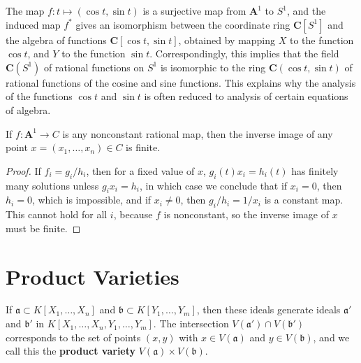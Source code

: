 \begin{example}
    The map $f: t \mapsto (\cos t, \sin t)$ is a surjective map from $\mathbf{A}^1$ to $S^1$, and the induced map $f^*$ gives an isomorphism between the coordinate ring $\mathbf{C}[S^1]$ and the algebra of functions $\mathbf{C}[\cos t, \sin t]$, obtained by mapping $X$ to the function $\cos t$, and $Y$ to the function $\sin t$. Correspondingly, this implies that the field $\mathbf{C}(S^1)$ of rational functions on $S^1$ is isomorphic to the ring $\mathbf{C}(\cos t, \sin t)$ of rational functions of the cosine and sine functions. This explains why the analysis of the functions $\cos t$ and $\sin t$ is often reduced to analysis of certain equations of algebra.
\end{example}

\begin{theorem}
    If $f: \mathbf{A}^1 \to C$ is any nonconstant rational map, then the inverse image of any point $x = (x_1, \dots, x_n) \in C$ is finite.
\end{theorem}
\begin{proof}
    If $f_i = g_i/h_i$, then for a fixed value of $x$, $g_i(t)x_i = h_i(t)$ has finitely many solutions unless $g_ix_i = h_i$, in which case we conclude that if $x_i = 0$, then $h_i = 0$, which is impossible, and if $x_i \neq 0$, then $g_i/h_i = 1/x_i$ is a constant map. This cannot hold for all $i$, because $f$ is nonconstant, so the inverse image of $x$ must be finite.
\end{proof}

\section{Product Varieties}

If $\mathfrak{a} \subset K[X_1, \dots, X_n]$ and $\mathfrak{b} \subset K[Y_1, \dots, Y_m]$, then these ideals generate ideals $\mathfrak{a}'$ and $\mathfrak{b}'$ in $K[X_1, \dots, X_n, Y_1, \dots, Y_m]$. The intersection $V(\mathfrak{a}') \cap V(\mathfrak{b}')$ corresponds to the set of points $(x,y)$ with $x \in V(\mathfrak{a})$ and $y \in V(\mathfrak{b})$, and we call this the {\bf product variety} $V(\mathfrak{a}) \times V(\mathfrak{b})$.


